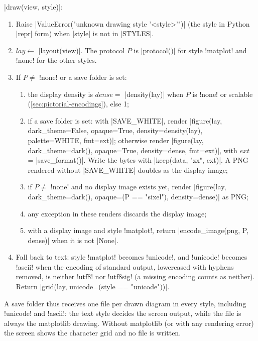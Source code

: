 {\begin{algorithm}\label{alg:pictorial-draw}
\py|draw(view, style)|:
\begin{enumerate}
  \item Raise \py|ValueError("unknown drawing style '<style>'")| (the style in Python
    \py|repr| form) when \py|style| is not in \py|STYLES|.
  \item $\mathit{lay}\gets$ \py|layout(view)|. The protocol $P$ is \py|protocol()| for style
    \code!matplot! and \code!none! for the other styles.
  \item If $P\neq$ \code!none! or a save folder is set:
    \begin{enumerate}
      \item the display density is $\mathit{dense} = $ \py|density(lay)| when $P$ is \code!none!
        or scalable (\cref{sec:pictorial-encodings}), else 1;
      \item if a save folder is set: with \py|SAVE_WHITE|, render
        \py|figure(lay, dark_theme=False, opaque=True, density=density(lay), palette=WHITE, fmt=ext)|;
        otherwise render \py|figure(lay, dark_theme=dark(), opaque=True, density=dense, fmt=ext)|,
        with $\mathit{ext}$ = \py|save_format()|. Write the bytes with
        \py|keep(data, "zx", ext)|. A PNG rendered without \py|SAVE_WHITE| doubles as the
        display image;
      \item if $P\neq$ \code!none! and no display image exists yet, render
        \py|figure(lay, dark_theme=dark(), opaque=(P == "sixel"), density=dense)| as PNG;
      \item any exception in these renders discards the display image;
      \item with a display image and style \code!matplot!, return
        \py|encode_image(png, P, dense)| when it is not \py|None|.
    \end{enumerate}
  \item Fall back to text: style \code!matplot! becomes \code!unicode!, and \code!unicode!
    becomes \code!ascii! when the encoding of standard output, lowercased with hyphens removed,
    is neither \code!utf8! nor \code!utf8sig! (a missing encoding counts as neither). Return
    \py|grid(lay, unicode=(style == "unicode"))|.
\end{enumerate}
\end{algorithm}

A save folder thus receives one file per drawn diagram in every style, including
\code!unicode! and \code!ascii!: the text style decides the screen output, while the file is
always the matplotlib drawing. Without matplotlib (or with any rendering error) the screen shows
the character grid and no file is written.

}
